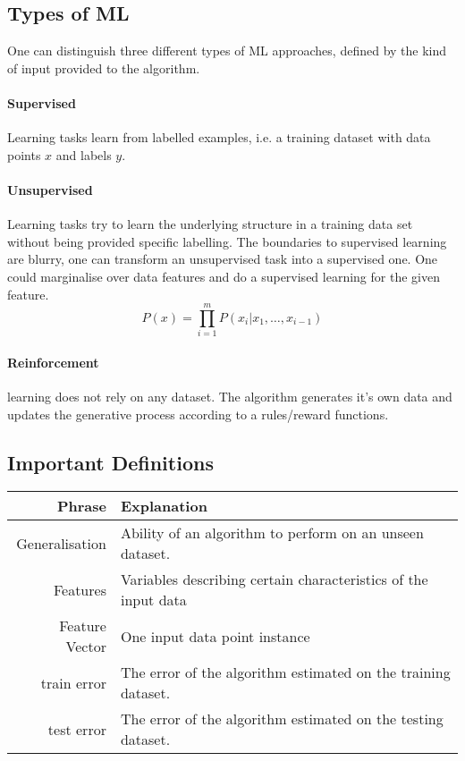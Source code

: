 \subsection{Types of ML}
One can distinguish three different types of ML approaches, defined by the kind of input
provided to the algorithm.
\paragraph{Supervised} Learning tasks learn from labelled examples, i.e. a training dataset with 
data points $x$ and labels $y$.
\paragraph{Unsupervised} Learning tasks try to learn the underlying structure in a training data set without 
being provided specific labelling. The boundaries to supervised learning are blurry, one can transform 
an unsupervised task into a supervised one. One could marginalise over data features and do a supervised 
learning for the given feature. %
$$
P(x)=\prod_{i=1}^mP(x_i|x_1,\ldots,x_{i-1})
$$

\paragraph{Reinforcement} learning does not rely on any dataset. The algorithm generates it's own data and 
updates the generative process according to a rules/reward functions.

\subsection{Important Definitions}
\begin{table}
  \begin{tabular}{r|l}
  Phrase & Explanation\\\hline
  Generalisation & Ability of an algorithm to perform on an unseen dataset.\\
  Features & Variables describing certain characteristics of the input data\\
  Feature Vector & One input data point instance\\
  train error & The error of the algorithm estimated on the training dataset.\\
  test error & The error of the algorithm estimated on the testing dataset.\\
  \end{tabular}
\end{table}




